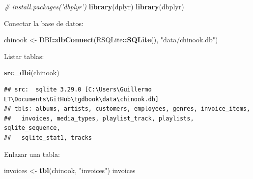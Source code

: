 \documentclass[]{book}
\newenvironment{Shaded}{\begin{snugshade}}{\end{snugshade}}
\newcommand{\CommentTok}[1]{\textcolor[rgb]{0.56,0.35,0.01}{\textit{#1}}}
\newcommand{\KeywordTok}[1]{\textcolor[rgb]{0.13,0.29,0.53}{\textbf{#1}}}
\newcommand{\NormalTok}[1]{#1}
\newcommand{\OperatorTok}[1]{\textcolor[rgb]{0.81,0.36,0.00}{\textbf{#1}}}
\newcommand{\StringTok}[1]{\textcolor[rgb]{0.31,0.60,0.02}{#1}}
\begin{document}
\begin{Shaded}
\begin{Highlighting}[]
\CommentTok{# install.packages('dbplyr')}
\KeywordTok{library}\NormalTok{(dplyr)}
\KeywordTok{library}\NormalTok{(dbplyr)}
\end{Highlighting}
\end{Shaded}

Conectar la base de datos:

\begin{Shaded}
\begin{Highlighting}[]
\NormalTok{chinook <-}\StringTok{ }\NormalTok{DBI}\OperatorTok{::}\KeywordTok{dbConnect}\NormalTok{(RSQLite}\OperatorTok{::}\KeywordTok{SQLite}\NormalTok{(), }\StringTok{"data/chinook.db"}\NormalTok{)}
\end{Highlighting}
\end{Shaded}

Listar tablas:

\begin{Shaded}
\begin{Highlighting}[]
\KeywordTok{src_dbi}\NormalTok{(chinook)}
\end{Highlighting}
\end{Shaded}

\begin{verbatim}
## src:  sqlite 3.29.0 [C:\Users\Guillermo LT\Documents\GitHub\tgdbook\data\chinook.db]
## tbls: albums, artists, customers, employees, genres, invoice_items,
##   invoices, media_types, playlist_track, playlists, sqlite_sequence,
##   sqlite_stat1, tracks
\end{verbatim}

Enlazar una tabla:

\begin{Shaded}
\begin{Highlighting}[]
\NormalTok{invoices <-}\StringTok{ }\KeywordTok{tbl}\NormalTok{(chinook, }\StringTok{"invoices"}\NormalTok{)}
\NormalTok{invoices}
\end{Highlighting}
\end{Shaded}
\end{document}
